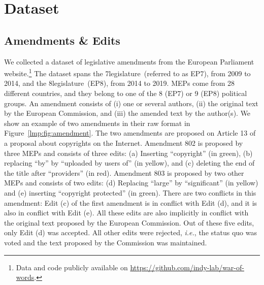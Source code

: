 \section{Dataset}
\label{lmp:sec:dataset}

\subsection{Amendments \& Edits}

We collected a dataset of  legislative amendments from the European Parliament website.\footnote{Data and code publicly available on \href{https://github.com/indy-lab/war-of-words}{https://github.com/indy-lab/war-of-words}.}
The dataset spans the 7\th legislature~(referred to as EP7), from 2009 to 2014, and the 8\th legislature~(EP8), from 2014 to 2019.
MEPs come from 28 different countries, and they belong to one of the 8 (EP7) or 9 (EP8) political groups.
An amendment consists of (i) one or several authors, (ii) the original text by the European Commission, and (iii) the amended text by the author(s).
We show an example of two amendments in their raw format in Figure~\ref{lmp:fig:amendment}.
The two amendments are proposed on Article 13 of a proposal about copyrights on the Internet.
Amendment 802 is proposed by three MEPs and consists of three edits:
(a) Inserting ``copyright'' (in green), (b) replacing ``by'' by ``uploaded by users of'' (in yellow), and (c) deleting the end of the title after ``providers'' (in red).
Amendment 803 is proposed by two other MEPs and consists of two edits:
(d) Replacing ``large'' by ``significant'' (in yellow) and (e) inserting ``copyright protected'' (in green).
There are two conflicts in this amendment:
Edit (c) of the first amendment is in conflict with Edit (d), and it is also in conflict with Edit (e).
All these edits are also implicitly in conflict with the original text proposed by the European Commission.
Out of these five edits, only Edit (d) was accepted.
All other edits were rejected, \textit{i.e.}, the status quo was voted and the text proposed by the Commission was maintained.


